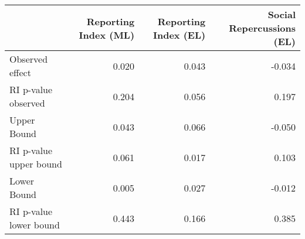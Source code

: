 
\begin{tabular}{l|r|r|r}
\hline
  & Reporting Index (ML) & Reporting Index (EL) & Social Repercussions (EL)\\
\hline
Observed effect & 0.020 & 0.043 & -0.034\\
\hline
RI p-value observed & 0.204 & 0.056 & 0.197\\
\hline
Upper Bound & 0.043 & 0.066 & -0.050\\
\hline
RI p-value upper bound & 0.061 & 0.017 & 0.103\\
\hline
Lower Bound & 0.005 & 0.027 & -0.012\\
\hline
RI p-value lower bound & 0.443 & 0.166 & 0.385\\
\hline
\end{tabular}
